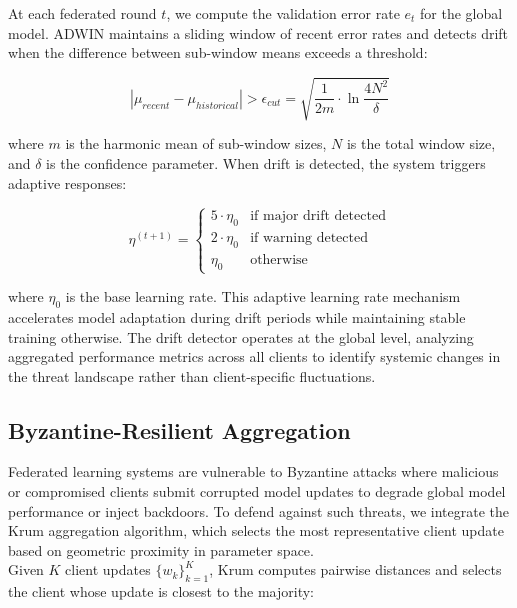At each federated round $t$, we compute the validation error rate $e_t$ for the global model. ADWIN maintains a sliding window of recent error rates and detects drift when the difference between sub-window means exceeds a threshold:

\begin{equation}
	\label{equation:drift-detection}
	|\mu_{recent} - \mu_{historical}| > \epsilon_{cut} = \sqrt{\frac{1}{2m} \cdot \ln\frac{4N^2}{\delta}}
\end{equation}

where $m$ is the harmonic mean of sub-window sizes, $N$ is the total window size, and $\delta$ is the confidence parameter. When drift is detected, the system triggers adaptive responses:

\begin{equation}
	\label{equation:adaptive-lr}
	\eta^{(t+1)} =
	\begin{cases}
		5 \cdot \eta_0 & \text{if major drift detected} \\
		2 \cdot \eta_0 & \text{if warning detected} \\
		\eta_0 & \text{otherwise}
	\end{cases}
\end{equation}

where $\eta_0$ is the base learning rate. This adaptive learning rate mechanism accelerates model adaptation during drift periods while maintaining stable training otherwise. The drift detector operates at the global level, analyzing aggregated performance metrics across all clients to identify systemic changes in the threat landscape rather than client-specific fluctuations.

\subsection{Byzantine-Resilient Aggregation}
\label{subsection:byzantine-resilience}
Federated learning systems are vulnerable to Byzantine attacks where malicious or compromised clients submit corrupted model updates to degrade global model performance or inject backdoors. To defend against such threats, we integrate the Krum aggregation algorithm, which selects the most representative client update based on geometric proximity in parameter space. \\

Given $K$ client updates $\{w_k\}_{k=1}^K$, Krum computes pairwise distances and selects the client whose update is closest to the majority:

